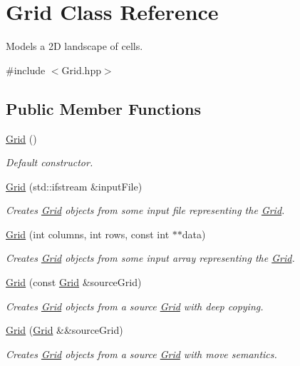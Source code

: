\hypertarget{class_grid}{}\section{Grid Class Reference}
\label{class_grid}


Models a 2D landscape of cells.  




{\ttfamily \#include $<$Grid.\+hpp$>$}

\subsection*{Public Member Functions}
\begin{DoxyCompactItemize}
\item 
\hyperlink{class_grid_a4ac9ff4f63552b4c61ff90fcb35ad66c}{Grid} ()
\begin{DoxyCompactList}\small\item\em Default constructor. \end{DoxyCompactList}\item 
\hyperlink{class_grid_a88ab1ccc8100827b4da40e62b7b77e96}{Grid} (std\+::ifstream \&input\+File)
\begin{DoxyCompactList}\small\item\em Creates \hyperlink{class_grid}{Grid} objects from some input file representing the \hyperlink{class_grid}{Grid}. \end{DoxyCompactList}\item 
\hyperlink{class_grid_a409a82781ea11352ad2615aea0e8cd22}{Grid} (int columns, int rows, const int $\ast$$\ast$data)
\begin{DoxyCompactList}\small\item\em Creates \hyperlink{class_grid}{Grid} objects from some input array representing the \hyperlink{class_grid}{Grid}. \end{DoxyCompactList}\item 
\hyperlink{class_grid_a2be5432331273bc420c252ea09631965}{Grid} (const \hyperlink{class_grid}{Grid} \&source\+Grid)
\begin{DoxyCompactList}\small\item\em Creates \hyperlink{class_grid}{Grid} objects from a source \hyperlink{class_grid}{Grid} with deep copying. \end{DoxyCompactList}\item 
\hyperlink{class_grid_a3828d0bf34f6c97ed93adc84d4ce6c4b}{Grid} (\hyperlink{class_grid}{Grid} \&\&source\+Grid)
\begin{DoxyCompactList}\small\item\em Creates \hyperlink{class_grid}{Grid} objects from a source \hyperlink{class_grid}{Grid} with move semantics. \end{DoxyCompactList}\item 
$$
\end{DoxyCompactItemize}
